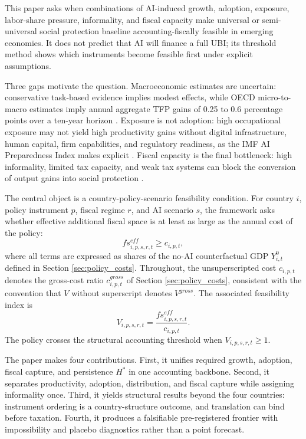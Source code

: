 \documentclass[11pt,a4paper]{article}
\begin{document}
This paper asks when combinations of AI-induced growth, adoption, exposure, labor-share pressure, informality, and fiscal capacity make universal or semi-universal social protection baseline accounting-fiscally feasible in emerging economies. It does not predict that AI will finance a full UBI; its threshold method shows which instruments become feasible first under explicit assumptions.

Three gaps motivate the question. Macroeconomic estimates are uncertain: conservative task-based evidence implies modest effects, while OECD micro-to-macro estimates imply annual aggregate TFP gains of 0.25 to 0.6 percentage points over a ten-year horizon \citep{acemoglu2024simple,filippucci2024miracle}. Exposure is not adoption: high occupational exposure may not yield high productivity gains without digital infrastructure, human capital, firm capabilities, and regulatory readiness, as the IMF AI Preparedness Index makes explicit \citep{cazzaniga2024genai}. Fiscal capacity is the final bottleneck: high informality, limited tax capacity, and weak tax systems can block the conversion of output gains into social protection \citep{gaspar2016tax}.

The central object is a country-policy-scenario feasibility condition. For country $i$, policy instrument $p$, fiscal regime $r$, and AI scenario $s$, the framework asks whether effective additional fiscal space is at least as large as the annual cost of the policy:
\begin{equation}
    fs^{eff}_{i,p,s,r,t} \geq c_{i,p,t},
\end{equation}
where all terms are expressed as shares of the no-AI counterfactual GDP $Y^0_{i,t}$ defined in Section \ref{sec:policy_costs}. Throughout, the unsuperscripted cost $c_{i,p,t}$ denotes the gross-cost ratio $c^{gross}_{i,p,t}$ of Section \ref{sec:policy_costs}, consistent with the convention that $V$ without superscript denotes $V^{gross}$. The associated feasibility index is
\begin{equation}
    V_{i,p,s,r,t}=\frac{fs^{eff}_{i,p,s,r,t}}{c_{i,p,t}}.
\end{equation}
The policy crosses the structural accounting threshold when $V_{i,p,s,r,t}\geq 1$.

The paper makes four contributions. First, it unifies required growth, adoption, fiscal capture, and persistence $H^*$ in one accounting backbone. Second, it separates productivity, adoption, distribution, and fiscal capture while assigning informality once. Third, it yields structural results beyond the four countries: instrument ordering is a country-structure outcome, and translation can bind before taxation. Fourth, it produces a falsifiable pre-registered frontier with impossibility and placebo diagnostics rather than a point forecast.
\end{document}
